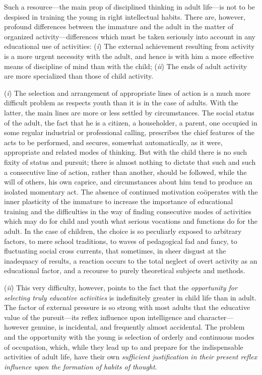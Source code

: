 \documentclass[showtrims,ustradepaper]{memoir}
\begin{document}
Such a resource---the main prop of disciplined thinking in adult
life---is not to be despised in training the young in right intellectual
habits. There are, however, profound differences between the immature
and
the
adult in the matter of organized activity---differences which must be
taken seriously into account in any educational use of activities:
(\emph{i}) The external achievement resulting from activity is a more
urgent necessity with the adult, and hence is with him a more effective
means of discipline of mind than with the child; (\emph{ii}) The ends of
adult activity are more specialized than those of child activity.


(\emph{i}) The selection and arrangement of appropriate lines of action
is a much more difficult problem as respects youth than it is in the
case of adults. With the latter, the main lines are more or less settled
by circumstances. The social status of the adult, the fact that he is a
citizen, a householder, a parent, one occupied in some regular
industrial or professional calling, prescribes the chief features of the
acts to be performed, and secures, somewhat automatically, as it were,
appropriate and related modes of thinking. But with the child there is
no such fixity of status and pursuit; there is almost nothing to dictate
that such and such a consecutive line of action, rather than another,
should be followed, while the will of others, his own caprice, and
circumstances about him tend to produce an isolated momentary act. The
absence of continued motivation coöperates with the inner plasticity of
the immature to increase the importance of educational training and the
difficulties in the way of finding consecutive modes of activities which
may do for child and youth what serious vocations and functions do for
the adult. In the case of children, the choice is so peculiarly exposed
to arbitrary factors, to mere school traditions, to waves of pedagogical
fad and fancy, to fluctuating social cross currents, that sometimes, in
sheer disgust at the inadequacy of results, a reaction
occurs
to the total neglect of overt activity as an educational factor, and a
recourse to purely theoretical subjects and methods.


(\emph{ii}) This very difficulty, however, points to the fact that the
\emph{opportunity for selecting truly educative activities} is
indefinitely greater in child life than in adult. The factor of external
pressure is so strong with most adults that the educative value of the
pursuit---its reflex influence upon intelligence and character---however
genuine, is incidental, and frequently almost accidental. The problem
and the opportunity with the young is selection of orderly and
continuous modes of occupation, which, while they lead up to and prepare
for the indispensable activities of adult life, have their own
\emph{sufficient justification in their present reflex influence upon
the formation of habits of thought}.
\end{document}
